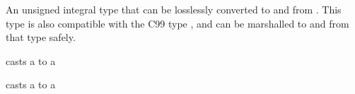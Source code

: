 \begin{haddockdesc}
\item[\begin{tabular}{@{}l}
data WordPtr
\end{tabular}]
{\haddockbegindoc
An unsigned integral type that can be losslessly converted to and from
 . This type is also compatible with the C99 type , and
 can be marshalled to and from that type safely.\par}
\end{haddockdesc}
\begin{haddockdesc}
\item[\begin{tabular}{@{}l}
instance Bits WordPtr\\instance Bounded WordPtr\\instance Enum WordPtr\\instance Storable WordPtr\\instance Ix WordPtr\\instance Num WordPtr\\instance Read WordPtr\\instance Integral WordPtr\\instance Real WordPtr\\instance Show WordPtr\\instance Eq WordPtr\\instance Ord WordPtr
\end{tabular}]
\end{haddockdesc}
\begin{haddockdesc}
\item[\begin{tabular}{@{}l}
ptrToWordPtr :: Ptr a -> WordPtr
\end{tabular}]
{\haddockbegindoc
casts a  to a \par}
\end{haddockdesc}
\begin{haddockdesc}
\item[\begin{tabular}{@{}l}
wordPtrToPtr :: WordPtr -> Ptr a
\end{tabular}]
{\haddockbegindoc
casts a  to a \par}
\end{haddockdesc}